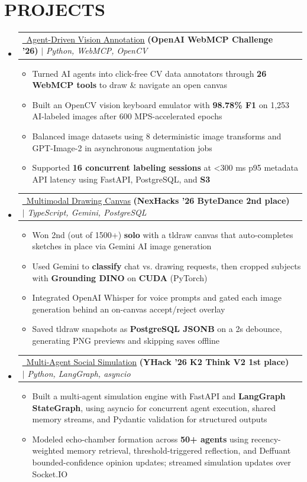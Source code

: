 \documentclass[letterpaper,11pt]{article}
\makeatletter
\newcommand{\resumeItem}[1]{
  \item\small{
    {#1 \vspace{-4pt}}
  }
}
\newcommand{\resumeProjectHeading}[2]{
    \item
    \begin{tabular*}{0.97\textwidth}[t]{l@{\extracolsep{\fill}}r}
      #1 & #2 \\
    \end{tabular*}\vspace{-7pt}
}
\newcommand{\resumeSubHeadingListStart}{\begin{itemize}[leftmargin=0.15in, label={}]}
\newcommand{\resumeSubHeadingListEnd}{\end{itemize}}
\newcommand{\resumeItemListStart}{\begin{itemize}}
\newcommand{\resumeItemListEnd}{\end{itemize}\vspace{-8pt}}
\makeatother
\begin{document}
\section{\textbf{PROJECTS}}
    \resumeSubHeadingListStart
    \resumeProjectHeading
  {\href{https://github.com/0xABAN/YADL}{\textcolor{linkblue}{\underline{\faGithub\ Agent-Driven Vision Annotation}}} \textbf{(OpenAI WebMCP Challenge '26)}
  $|$
  \emph{Python, WebMCP, OpenCV}
  }
  {}
  \resumeItemListStart
    \resumeItem{Turned AI agents into click-free CV data annotators through \textbf{26 WebMCP tools} to draw \& navigate an open canvas}
    \resumeItem{Built an OpenCV vision keyboard emulator with \textbf{98.78\% F1} on 1,253 AI-labeled images after 600 MPS-accelerated epochs}
    \resumeItem{Balanced image datasets using 8 deterministic image transforms and GPT-Image-2 in asynchronous augmentation jobs}
    \resumeItem{Supported \textbf{16 concurrent labeling sessions} at \textless{}300 ms p95 metadata API latency using FastAPI, PostgreSQL, and \textbf{S3}}
  \resumeItemListEnd
    \resumeProjectHeading
  {\href{https://github.com/AdamPSU/maestro}{\textcolor{linkblue}{\underline{\faGithub\ Multimodal Drawing Canvas}}} \textbf{(NexHacks '26 ByteDance 2nd place)}
  $|$
  \emph{TypeScript, Gemini, PostgreSQL}
  }
  {}
  \resumeItemListStart
    \resumeItem{Won 2nd (out of 1500+) \textbf{solo} with a tldraw canvas that auto-completes sketches in place via Gemini AI image generation}
    \resumeItem{Used Gemini to \textbf{classify} chat vs. drawing requests, then cropped subjects with \textbf{Grounding DINO} on \textbf{CUDA} (PyTorch)}
    \resumeItem{Integrated OpenAI Whisper for voice prompts and gated each image generation behind an on-canvas accept/reject overlay}
    \resumeItem{Saved tldraw snapshots as \textbf{PostgreSQL JSONB} on a 2s debounce, generating PNG previews and skipping saves offline}
  \resumeItemListEnd
     \resumeProjectHeading
  {\href{https://github.com/AdamPSU/simulacra}{\textcolor{linkblue}{\underline{\faGithub\ Multi-Agent Social Simulation}}} \textbf{(YHack '26 K2 Think V2 1st place)}
  $|$
  \emph{Python, LangGraph, asyncio}
  }{}
  \resumeItemListStart
    \resumeItem{Built a multi-agent simulation engine with FastAPI and \textbf{LangGraph StateGraph}, using asyncio for concurrent agent execution, shared memory streams, and Pydantic validation for structured outputs}
    \resumeItem{Modeled echo-chamber formation across \textbf{50+ agents} using recency-weighted memory retrieval, threshold-triggered reflection, and Deffuant bounded-confidence opinion updates; streamed simulation updates over Socket.IO}
  \resumeItemListEnd
    \resumeSubHeadingListEnd
\end{document}

